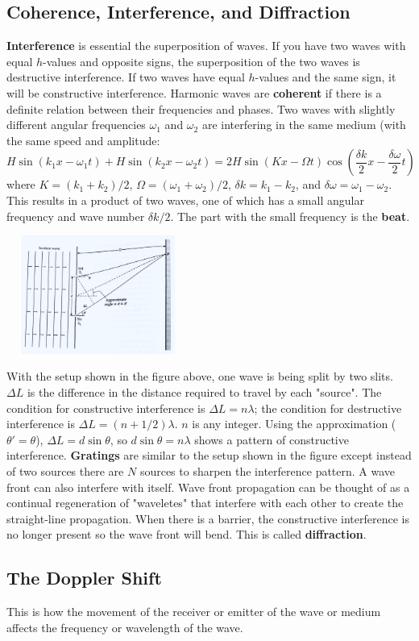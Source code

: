     \subsection*{Coherence, Interference, and Diffraction}
        \textbf{Interference} is essential the superposition of waves. If you have two waves with equal $h$-values and opposite signs, the superposition of the two waves is destructive interference. If two waves have equal $h$-values and the same sign, it will be constructive interference. Harmonic waves are \textbf{coherent} if there is a definite relation between their frequencies and phases.
        \newline \indent
        Two waves with slightly different angular frequencies $\omega_1$ and $\omega_2$ are interfering in the same medium (with the same speed and amplitude:
        \begin{equation*}
            H\sin(k_1x - \omega_1t) + H\sin(k_2x - \omega_2t) = 2H\sin(Kx - \Omega t)\cos(\frac{\delta k}{2}x - \frac{\delta \omega}{2}t)
        \end{equation*}
        where $K = (k_1 + k_2) / 2$, $\Omega = (\omega_1 + \omega_2) / 2$, $\delta k = k_1 - k_2$, and $\delta \omega = \omega_1 - \omega_2$. This results in a product of two waves, one of which has a small angular frequency and wave number $\delta k / 2$. The part with the small frequency is the \textbf{beat}.
        \begin{center}
            \includegraphics[width=170pt, height=110pt]{interference.jpg}
        \end{center}
        With the setup shown in the figure above, one wave is being split by two slits. $\Delta L$ is the difference in the distance required to travel by each "source". The condition for constructive interference is $\Delta L = n\lambda$; the condition for destructive interference is $\Delta L = (n + 1/2)\lambda$. $n$ is any integer. Using the approximation ($\theta' = \theta$), $\Delta L = d\sin\theta$, so $d\sin\theta = n\lambda$ shows a pattern of constructive interference.
        \newline \indent
        \textbf{Gratings} are similar to the setup shown in the figure except instead of two sources there are $N$ sources to sharpen the interference pattern.
        \newline \indent
        A wave front can also interfere with itself. Wave front propagation can be thought of as a continual regeneration of "waveletes" that interfere with each other to create the straight-line propagation. When there is a barrier, the constructive interference is no longer present so the wave front will bend. This is called \textbf{diffraction}. 
    \subsection*{The Doppler Shift}
        This is how the movement of the receiver or emitter of the wave or medium affects the frequency or wavelength of the wave.